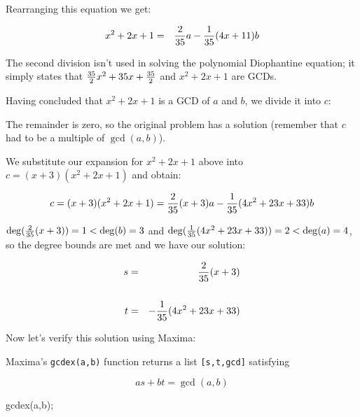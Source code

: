 Rearranging this equation we get:

\begin{eqnarray*}
x^2+2x+1 &=& {2\over35}a - {1\over35}(4x+11)b \cr
\end{eqnarray*}

The second division isn't used in solving the polynomial
Diophantine equation; it simply states that
${35\over2}x^2+35x+{35\over2}$ and $x^2+2x+1$ are GCDs.

Having concluded that
$x^2+2x+1$ is a GCD of $a$ and $b$, we divide it into $c$:



The remainder is zero, so the original problem has a solution
(remember that $c$ had to be a multiple of $\gcd(a,b)$).

We substitute our expansion for $x^2+2x+1$ above into $c=(x+3)(x^2+2x+1)$
and obtain:


$$c = (x+3)(x^2+2x+1)
 = {2\over35}(x+3)a - {1\over35}(4x^2+23x+33)b $$

$\deg({2\over35}(x+3)) = 1 < \deg(b) = 3$ and $\deg({1\over35}(4x^2+23x+33))
= 2 < \deg(a) = 4$, so the degree bounds are met and we have our solution:

\begin{eqnarray*}
s &=& {2\over35}(x+3) \cr\cr
t &=& - {1\over35}(4x^2+23x+33) \cr
\end{eqnarray*}

Now let's verify this solution using Maxima:



Maxima's {\tt gcdex(a,b)} function returns a list {\tt [s,t,gcd]} satisfying

$$as + bt = \gcd(a,b)$$

\begin{maximablock}
gcdex(a,b);
\end{maximablock}

\vfill\eject

